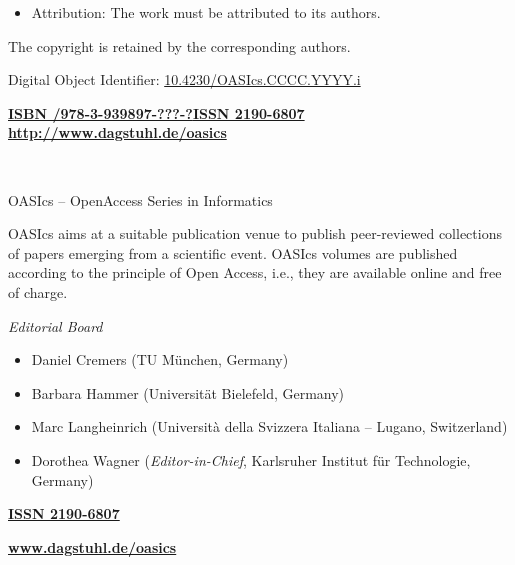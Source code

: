 \documentclass[a4paper,UKenglish]{oasicsmaster}
\begin{document}
\begin{publicationinfo}
\begin{itemize}
\item Attribution: The work must be attributed to its authors.
\end{itemize}

\smallskip

The copyright is retained by the corresponding authors.

\bigskip
\bigskip
\bigskip
\bigskip

Digital Object Identifier: \href{http://dx.doi.org/10.4230/OASIcs.CCCC.YYYY.i}{10.4230/OASIcs.CCCC.YYYY.i}

\vfill
\textbf{\href{http://www.dagstuhl.de/dagpub//978-3-939897-???-?}{ISBN /978-3-939897-???-?}}\qquad \qquad \textbf{\href{http://drops.dagstuhl.de/oasics}{ISSN 2190-6807}}  \hfill \textbf{\href{http://www.dagstuhl.de/oasics}{http://www.dagstuhl.de/oasics}}


  
 \newpage

\ \\
\bigskip
\bigskip
\bigskip

{\Large OASIcs -- OpenAccess Series in Informatics}
 
 \bigskip
OASIcs aims at a suitable publication venue to publish peer-reviewed collections of papers emerging from a scientific event.
OASIcs volumes are published according to the principle of Open Access, i.e., they are available online and free of charge. 

 
 \bigskip
 \bigskip
 \bigskip
 
 
\emph{Editorial Board}

\begin{itemize}
\item Daniel Cremers (TU M\"unchen, Germany)
\item Barbara Hammer (Universit\"at Bielefeld, Germany)
\item Marc Langheinrich (Universit\`a della Svizzera Italiana -- Lugano, Switzerland)
\item Dorothea Wagner (\emph{Editor-in-Chief}, Karlsruher Institut f\"{u}r Technologie, Germany)
 \end{itemize}


 \bigskip
 \bigskip
 \bigskip


{\large\bf\sffamily \href{http://drops.dagstuhl.de/oasics}{ISSN 2190-6807}}

 \bigskip
 \bigskip
 \bigskip

{\Large\bf\sffamily \href{http://www.dagstuhl.de/oasics}{www.dagstuhl.de/oasics}}
 
 \vfill
 
 \newpage
 
 \thispagestyle{empty}
 
\end{publicationinfo}
\end{document}
